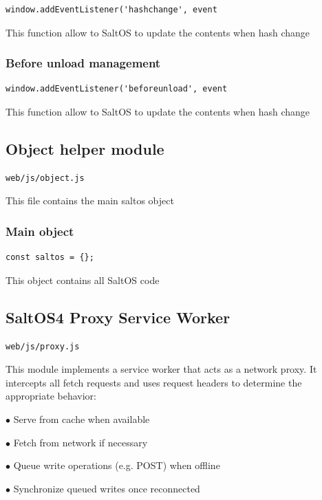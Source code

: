 \documentclass[a4paper]{article}
\begin{document}
\begin{lstlisting}
window.addEventListener('hashchange', event
\end{lstlisting}

This function allow to SaltOS to update the contents when hash change

\hypertarget{toc258}{}
\subsubsection{Before unload management}

\begin{lstlisting}
window.addEventListener('beforeunload', event
\end{lstlisting}

This function allow to SaltOS to update the contents when hash change

\hypertarget{toc259}{}
\subsection{Object helper module}

\begin{lstlisting}
web/js/object.js
\end{lstlisting}

This file contains the main saltos object

\hypertarget{toc260}{}
\subsubsection{Main object}

\begin{lstlisting}
const saltos = {};
\end{lstlisting}

This object contains all SaltOS code

\hypertarget{toc261}{}
\subsection{SaltOS4 Proxy Service Worker}

\begin{lstlisting}
web/js/proxy.js
\end{lstlisting}

This module implements a service worker that acts as a network proxy.
It intercepts all fetch requests and uses request headers to determine
the appropriate behavior:

\begin{compactitem}
\item[\color{myblue}$\bullet$] Serve from cache when available
\item[\color{myblue}$\bullet$] Fetch from network if necessary
\item[\color{myblue}$\bullet$] Queue write operations (e.g. POST) when offline
\item[\color{myblue}$\bullet$] Synchronize queued writes once reconnected
\end{compactitem}
\end{document}
